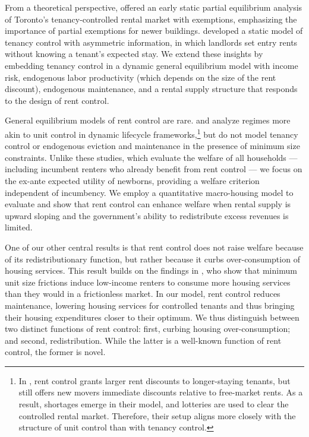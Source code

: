 \documentclass[parskip=full]{article}
\begin{document}
From a theoretical perspective, \citet{fallis-1985} offered an early static partial equilibrium analysis of Toronto’s tenancy-controlled rental market with exemptions, emphasizing the importance of partial exemptions for newer buildings. \citet{be-2000} developed a static model of tenancy control with asymmetric information, in which landlords set entry rents without knowing a tenant’s expected stay. We extend these insights by embedding tenancy control in a dynamic general equilibrium model with income risk, endogenous labor productivity (which depends on the size of the rent discount), endogenous maintenance, and a rental supply structure that responds to the design of rent control.

General equilibrium models of rent control are rare. \citet{eric-1995} and \citet{fmn-2023} analyze regimes more akin to unit control in dynamic lifecycle frameworks,\footnote{In \citet{fmn-2023}, rent control grants larger rent discounts to longer-staying tenants, but still offers new movers immediate discounts relative to free-market rents. As a result, shortages emerge in their model, and lotteries are used to clear the controlled rental market. Therefore, their setup aligns more closely with the structure of unit control than with tenancy control.} but do not model tenancy control or endogenous eviction and maintenance in the presence of minimum size constraints. Unlike these studies, which evaluate the welfare of all households — including incumbent renters who already benefit from rent control — we focus on the ex-ante expected utility of newborns, providing a welfare criterion independent of incumbency. We employ a quantitative macro-housing model to evaluate and show that rent control can enhance welfare when rental supply is upward sloping and the government’s ability to redistribute excess revenues is limited.

One of our other central results is that rent control does not raise welfare because of its redistributionary function, but rather because it curbs over-consumption of housing services. This result builds on the findings in \citet{rs-2023}, who show that minimum unit size frictions induce low-income renters to consume more housing services than they would in a frictionless market. In our model, rent control reduces maintenance, lowering housing services for controlled tenants and thus bringing their housing expenditures closer to their optimum. We thus distinguish between two distinct functions of rent control: first, curbing housing over-consumption; and second, redistribution. While the latter is a well-known function of rent control, the former is novel. 
\end{document}
